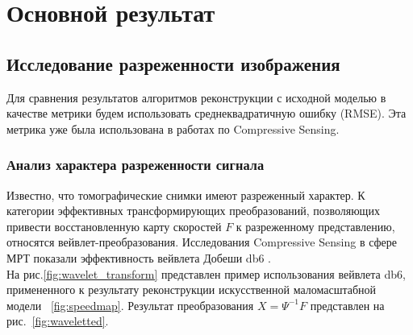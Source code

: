 \documentclass[14pt]{matmex-diploma}
\begin{document}
\section{Основной результат} \label{sec:main_result}
\subsection{Исследование разреженности изображения}
Для сравнения результатов алгоритмов реконструкции с исходной моделью в качестве метрики будем использовать среднеквадратичную ошибку (RMSE). Эта метрика уже была использована в работах по Compressive Sensing. 



\subsubsection{Анализ характера разреженности сигнала} \label{sec:s_analysis}
Известно, что томографические снимки имеют разреженный характер. К категории эффективных трансформирующих преобразований, позволяющих привести восстановленную карту скоростей $F$ к разреженному представлению, относятся вейвлет-преобразования. Исследования Compressive Sensing в сфере МРТ показали эффективность вейвлета Добеши db6 \cite{lustig2007sparse}. \\
На рис.\ref{fig:wavelet_transform} представлен пример использования вейвлета db6, примененного к результату реконструкции искусственной маломасштабной модели ~\ref{fig:speedmap}. Результат преобразования $X = \Psi^{-1} F$ представлен на рис.~\ref{fig:waveletted}.\\
\end{document}
